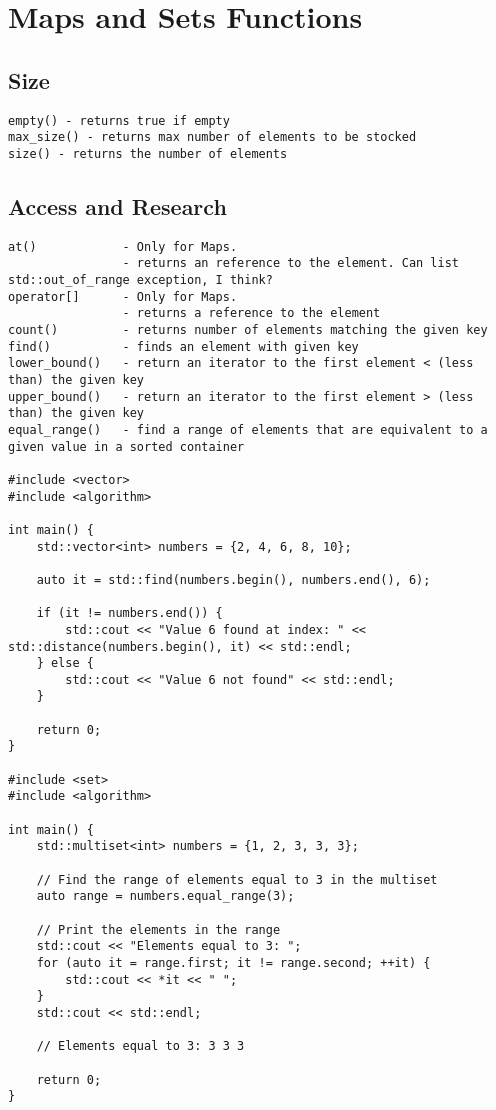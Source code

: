 \section{Maps and Sets Functions}

\subsection{Size}

\begin{verbatim}
empty() - returns true if empty
max_size() - returns max number of elements to be stocked
size() - returns the number of elements
\end{verbatim}


\subsection{Access and Research}

\begin{verbatim}
at()            - Only for Maps.
                - returns an reference to the element. Can list std::out_of_range exception, I think? 
operator[]      - Only for Maps.
                - returns a reference to the element
count()         - returns number of elements matching the given key
find()          - finds an element with given key
lower_bound()   - return an iterator to the first element < (less than) the given key
upper_bound()   - return an iterator to the first element > (less than) the given key
equal_range()   - find a range of elements that are equivalent to a given value in a sorted container

#include <vector>
#include <algorithm>

int main() {
    std::vector<int> numbers = {2, 4, 6, 8, 10};

    auto it = std::find(numbers.begin(), numbers.end(), 6);

    if (it != numbers.end()) {
        std::cout << "Value 6 found at index: " << std::distance(numbers.begin(), it) << std::endl;
    } else {
        std::cout << "Value 6 not found" << std::endl;
    }

    return 0;
}

#include <set>
#include <algorithm>

int main() {
    std::multiset<int> numbers = {1, 2, 3, 3, 3};

    // Find the range of elements equal to 3 in the multiset
    auto range = numbers.equal_range(3);

    // Print the elements in the range
    std::cout << "Elements equal to 3: ";
    for (auto it = range.first; it != range.second; ++it) {
        std::cout << *it << " ";
    }
    std::cout << std::endl;

    // Elements equal to 3: 3 3 3

    return 0;
}
\end{verbatim}


